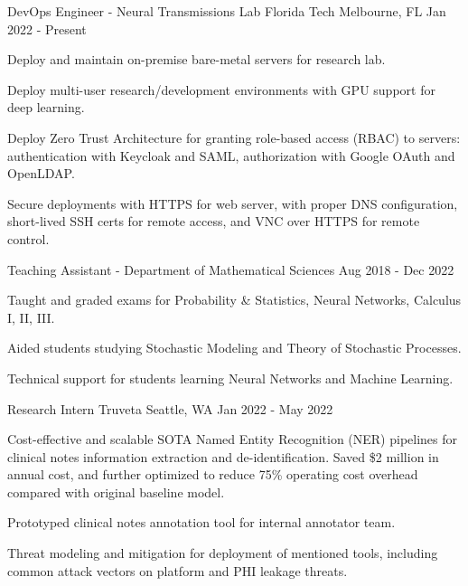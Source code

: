 \vspace{-4mm}
\vspace{-2mm}
\begin{cventries}

	\cventry
	{DevOps Engineer - Neural Transmissions Lab}
	{Florida Tech}
	{Melbourne, FL}
	{Jan 2022 - Present}
	{\begin{cvitems}
			\item {Deploy and maintain on-premise bare-metal servers for research lab.}
			\item {Deploy multi-user research/development environments with GPU support for deep learning.}
			\item {Deploy Zero Trust Architecture for granting role-based access (RBAC) to servers: authentication with Keycloak and SAML, authorization with Google OAuth and OpenLDAP.}
			\item {Secure deployments with HTTPS for web server, with proper DNS configuration, short-lived SSH certs for remote access, and VNC over HTTPS for remote control.}
		\end{cvitems}}

	\vspace{-2mm}

	\cventry
	{Teaching Assistant - Department of Mathematical Sciences}
	{}
	{}
	{Aug 2018 - Dec 2022}
	{\begin{cvitems}
			\item {Taught and graded exams for Probability \& Statistics, Neural Networks, Calculus I, II, III.}
			\item {Aided students studying Stochastic Modeling and Theory of Stochastic Processes.}
			\item {Technical support for students learning Neural Networks and Machine Learning.}
		\end{cvitems}}

	\vspace{-1mm}

	\cventry
	{Research Intern}
	{Truveta}
	{Seattle, WA}
	{Jan 2022 - May 2022}
	{\begin{cvitems}
			\item {Cost-effective and scalable SOTA Named Entity Recognition (NER) pipelines for clinical notes information extraction and de-identification. Saved \$2 million in annual cost, and further optimized to reduce 75\% operating cost overhead compared with original baseline model.}
			\item {Prototyped clinical notes annotation tool for internal annotator team.}
			\item {Threat modeling and mitigation for deployment of mentioned tools, including common attack vectors on platform and PHI leakage threats.}
		\end{cvitems}}


\end{cventries}
